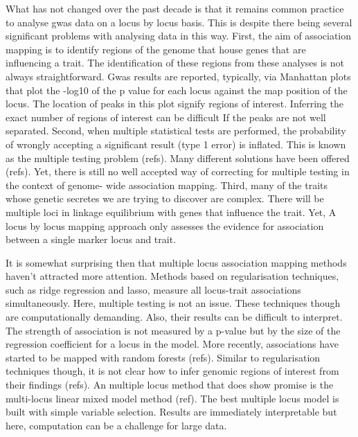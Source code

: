 \documentclass[12pt]{article}
\begin{document}
What has not changed over the past decade is that it remains common practice to analyse gwas data on a locus by locus basis. This is despite there being several significant problems with analysing data in this way. First, the aim of association mapping is to identify regions of the genome that house genes that are influencing a trait. The identification of these regions from these analyses is not always straightforward. Gwas results are reported, typically, via Manhattan plots that plot the -log10 of the p value for each locus against the map position of the locus. The location of peaks in this plot signify regions of interest. Inferring the exact number of regions of interest can be difficult If the peaks are not well separated. Second, when multiple statistical tests are performed, the probability of wrongly accepting a significant result (type 1 error) is inflated. This is known as the multiple testing problem (refs). Many different solutions have been offered (refs). Yet, there is still no well accepted way of correcting for multiple testing in the context of genome- wide association mapping. Third, many of the traits whose genetic secretes we are trying to discover are complex. There will be multiple loci in linkage equilibrium with genes that influence the trait. Yet, A locus by locus mapping approach only assesses the evidence for association between a single marker locus and trait.

It is somewhat surprising then that multiple locus association mapping methods haven't attracted more attention. Methods based on 
regularisation techniques, such as ridge regression and lasso, measure all locus-trait associations simultaneously. 
Here, multiple testing is not an issue. These techniques though are computationally demanding. Also, their results can be difficult to interpret. The strength of association is not measured by a p-value but by the size of the regression coefficient for a locus in the model. More recently, associations have started to be mapped with random forests (refs). Similar to regularisation techniques though, it is not clear how to infer genomic regions of interest from their findings (refs). An multiple locus method that does show promise is the multi-locus linear mixed model method (ref). The best multiple locus model is built with simple variable selection. Results are immediately interpretable but here, computation can be a challenge for large data.
\end{document}
